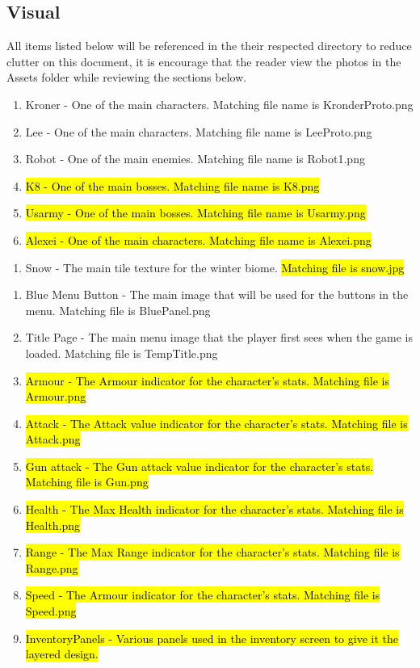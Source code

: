 \documentclass{article}
\begin{document}
\subsection{Visual}
\quad All items listed below will be referenced in the their respected directory to reduce clutter on this document, it is encourage that the reader view the photos in the Assets folder while reviewing the sections below.
\begin{enumerate}[{Sprite}1.]
	\item Kroner - One of the main characters. Matching file name is KronderProto.png
	\item Lee - One of the main characters. Matching file name is LeeProto.png
	\item Robot - One of the main enemies. Matching file name is  Robot1.png
	\item\hl{K8 - One of the main bosses. Matching file name is K8.png}
	\item\hl{Usarmy - One of the main bosses. Matching file name is Usarmy.png}
	\item \hl{Alexei - One of the main characters. Matching file name is Alexei.png}
\end{enumerate}
\begin{enumerate}[{Texture}1.]
	\item Snow - The main tile texture for the winter biome. \hl{Matching file is snow.jpg}
\end{enumerate}
\begin{enumerate}[{UI}1.]
	\item Blue Menu Button - The main image that will be used for the buttons in the menu. Matching file is BluePanel.png
	\item Title Page - The main menu image that the player first sees when the game is loaded. Matching file is TempTitle.png
	\item \hl{Armour - The Armour indicator for the character's stats. Matching file is Armour.png}
	\item \hl{Attack - The Attack value indicator for the character's stats. Matching file is Attack.png}
	\item \hl{Gun attack - The Gun attack value indicator for the character's stats. Matching file is Gun.png}
	\item \hl{Health - The Max Health indicator for the character's stats. Matching file is Health.png}
	\item \hl{Range - The Max Range indicator for the character's stats. Matching file is Range.png}
	\item \hl{Speed - The Armour indicator for the character's stats. Matching file is Speed.png}
	\item \hl{InventoryPanels - Various panels used in the inventory screen to give it the layered design.}
\end{enumerate}
\end{document}
